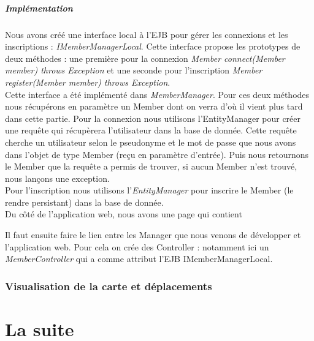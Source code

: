 \documentclass[a4paper,11pt]{report}
\begin{document}
      \paragraph{Implémentation}
        Nous avons créé une interface local à l'EJB pour gérer les connexions et les inscriptions : \textit{IMemberManagerLocal}. Cette interface propose les prototypes de deux méthodes : une première pour la connexion \textit{Member connect(Member member) throws Exception} et une seconde pour l'inscription \textit{Member register(Member member) throws Exception}.\\
        Cette interface a été implémenté dans \textit{MemberManager}. Pour ces deux méthodes nous récupérons en paramètre un Member dont on verra d'où il vient plus tard dans cette partie. Pour la connexion nous utilisons l'EntityManager pour créer une requête qui récupèrera l'utilisateur dans la base de donnée. Cette requête cherche un utilisateur selon le pseudonyme et le mot de passe que nous avons dans l'objet de type Member (reçu en paramètre d'entrée). Puis nous retournons le Member que la requête a permis de trouver, si aucun Member n'est trouvé, nous lançons une exception.\\
        Pour l'inscription nous utilisons l'\textit{EntityManager} pour inscrire le Member (le rendre persistant) dans la base de donnée.\\
        
        Du côté de l'application web, nous avons une page qui contient 
        
        Il faut ensuite faire le lien entre les Manager que nous venons de développer et l'application web. Pour cela on crée des Controller : notamment ici un \textit{MemberController} qui a comme attribut l'EJB IMemberManagerLocal.
      

    \subsection{Visualisation de la carte et déplacements}
    
\chapter{La suite}
\end{document}
